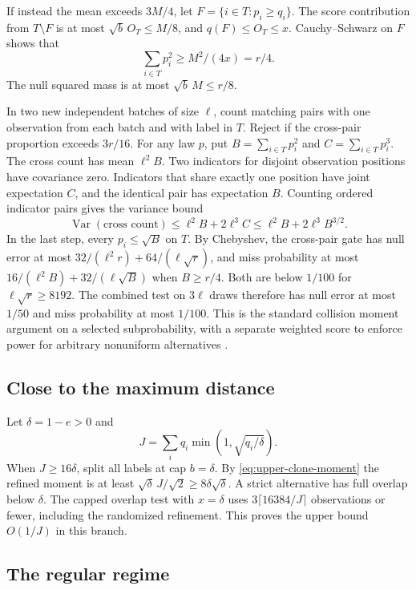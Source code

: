 If instead the mean exceeds \(3M/4\), let
\(F=\{i\in T:p_i\ge q_i\}\). The score contribution from \(T\setminus F\)
is at most \(\sqrt b\,O_T\le M/8\), and \(q(F)\le O_T\le x\).
Cauchy--Schwarz on \(F\) shows that
\[
  \sum_{i\in T}p_i^2\ge M^2/(4x)=r/4.
\]
The null squared mass is at most \(\sqrt b\,M\le r/8\).

In two new independent batches of size \(\ell\), count matching pairs
with one observation from each batch and with label in \(T\). Reject if
the cross-pair proportion exceeds \(3r/16\). For any law \(p\), put
\(B=\sum_{i\in T}p_i^2\) and \(C=\sum_{i\in T}p_i^3\). The cross count
has mean \(\ell^2 B\). Two indicators for disjoint observation positions
have covariance zero. Indicators that share exactly one position
have joint expectation \(C\), and the identical pair has expectation
\(B\). Counting ordered indicator pairs gives the variance bound
\[
  \operatorname{Var}(\text{cross count})
  \le \ell^2 B+2\ell^3 C
  \le \ell^2 B+2\ell^3 B^{3/2}.
\]
In the last step, every \(p_i\le\sqrt{B}\) on \(T\).
By Chebyshev, the cross-pair gate has null error at most
\(32/(\ell^2 r)+64/(\ell\sqrt r)\), and miss probability
at most \(16/(\ell^2 B)+32/(\ell\sqrt B)\) when \(B\ge r/4\).
Both are below \(1/100\) for \(\ell\sqrt r\ge8192\).
The combined test on \(3\ell\) draws therefore has null error at most
\(1/50\) and miss probability at most \(1/100\).
This is the standard collision moment argument on a selected
subprobability, with a separate weighted score to enforce power
for arbitrary nonuniform alternatives \cite{paninski2008}.

\subsection{Close to the maximum distance}

Let \(\delta=1-e>0\) and
\[
 J=\sum_i q_i\min(1,\sqrt{q_i/\delta}).
\]
When \(J\ge16\delta\), split all labels at cap \(b=\delta\). By
\eqref{eq:upper-clone-moment} the refined moment is at least
\(\sqrt{\delta}\,J/\sqrt 2\ge8\delta\sqrt\delta\).
A strict alternative has full overlap below \(\delta\).
The capped overlap test with \(x=\delta\) uses
\(3\lceil16384/J\rceil\) observations or fewer, including the randomized
refinement. This proves the upper bound \(O(1/J)\) in this branch.

\subsection{The regular regime}

